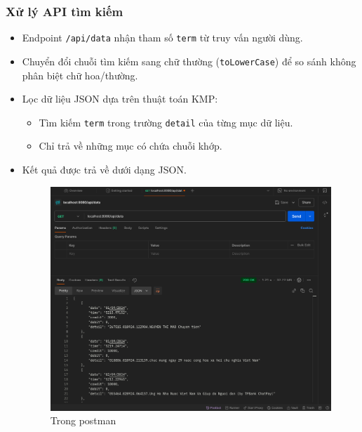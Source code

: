 \subsubsection{Xử lý API tìm kiếm}
\begin{itemize}
    \item Endpoint \texttt{/api/data} nhận tham số \texttt{term} từ truy vấn người dùng.
    \item Chuyển đổi chuỗi tìm kiếm sang chữ thường (\texttt{toLowerCase}) để so sánh không phân biệt chữ hoa/thường.
    \item Lọc dữ liệu JSON dựa trên thuật toán KMP:
    \begin{itemize}
        \item Tìm kiếm \texttt{term} trong trường \texttt{detail} của từng mục dữ liệu.
        \item Chỉ trả về những mục có chứa chuỗi khớp.
    \end{itemize}
    \item Kết quả được trả về dưới dạng JSON.

\begin{figure}[!ht]
\centering
\includegraphics[width=15cm]{Images/img/postman.png}
\caption{Trong postman}
\end{figure}
\end{itemize}
